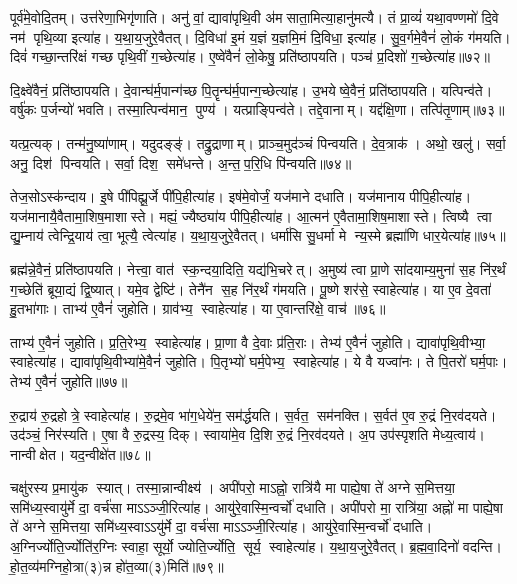 पूर्व॑मे॒वोदि॒तम्। 
उत्त॑रेणा॒भिगृ॑णाति। 
अनु॑ वां॒ द्यावा॑पृथि॒वी अ॑मसाता॒मित्या॒हानु॑मत्यै। 
तं प्रा॒व्यं॑ यथा॒वण्णमो॑ दि॒वे नम॑ पृथि॒व्या इत्या॑ह। 
य॒था॒य॒जुरे॒वैतत्। 
दि॒विधा॑ इ॒मं य॒ज्ञं य॒ज्ञमि॒मं दि॒विधा॒ इत्या॑ह। 
सु॒व॒र्गमे॒वैनं॑ लो॒कं ग॑मयति। 
दिवं॑ गच्छा॒न्तरि॑क्षं गच्छ पृथि॒वीं ग॒च्छेत्या॑ह। 
ए॒ष्वे॑वैनं॑ लो॒केषु॒ प्रति॑ष्ठापयति। 
पञ्च॑ प्र॒दिशो॑ ग॒च्छेत्या॑ह॥७२॥

दि॒क्ष्वे॑वैनं॒ प्रति॑ष्ठापयति। 
दे॒वान्घ॑र्म॒पान्ग॑च्छ पि॒तॄन्घ॑र्म॒पान्ग॒च्छे\-त्या॑ह। 
उ॒भयेष्वे॒वैनं॒ प्रति॑ष्ठापयति। 
यत्पिन्व॑ते। 
वर्\mbox{}षु॑कः प॒र्जन्यो॑ भवति। 
तस्मा॒त्पिन्व॑मान॒ पुण्य॑। 
यत्प्राङ्पिन्व॑ते। 
तद्दे॒वानाम्। 
यद्द॑क्षि॒णा। 
तत्पि॑तृ॒णाम्॥७३॥

यत्प्र॒त्यक्। 
तन्म॑नु॒ष्या॑णाम्। 
यदुदङ्ङ्॑। 
तद्रु॒द्राणाम्। 
प्राञ्च॒मुद॑ञ्चं पिन्वयति। 
दे॒व॒त्राक॑। 
अथो॒ खलु॑। 
सर्वा॒ अनु॒ दिश॑ पिन्वयति। 
सर्वा॒ दिश॒ समे॑धन्ते। 
अ॒न्त॒प॒रि॒धि पि॑न्वयति॥७४॥

तेज॒सोऽस्क॑न्दाय। 
इ॒षे पी॑पिह्यू॒र्जे पी॑पि॒हीत्या॑ह। 
इष॑मे॒वोर्जं॒ यज॑माने दधाति। 
यज॑मानाय पीपि॒हीत्या॑ह। 
यज॑मानायै॒वैतामा॒शिष॒माशास्ते। 
मह्यं॒ ज्यैष्ठ्या॑य पीपि॒हीत्या॑ह। 
आ॒त्मन॑ ए॒वैतामा॒शिष॒माशास्ते। 
त्विष्यै त्वा द्यु॒म्नाय॑ त्वेन्द्रि॒याय॑ त्वा॒ भूत्यै॒ त्वेत्या॑ह। 
य॒था॒य॒जुरे॒वैतत्। 
धर्मा॑सि सु॒धर्मा मे न्य॒स्मे ब्रह्मा॑णि धार॒येत्या॑ह॥७५॥

ब्रह्म॑न्ने॒वैनं॒ प्रति॑ष्ठापयति। 
नेत्त्वा॒ वात॑ स्क॒न्दया॒दिति॒ यद्य॑भि॒चरेत्। 
अ॒मुष्य॑ त्वा प्रा॒णे सा॑दयाम्य॒मुना॑ स॒ह नि॑र॒र्थं ग॒च्छेति॑ ब्रूया॒द्यं द्वि॒ष्यात्। 
यमे॒व द्वेष्टि॑। 
तेनै॑न स॒ह नि॑र॒र्थं ग॑मयति। 
पू॒ष्णे शर॑से॒ स्वाहेत्या॑ह। 
या ए॒व दे॒वता॑ हु॒तभा॑गाः। 
ताभ्य॑ ए॒वैनं॑ जुहोति। 
ग्राव॑भ्य॒ स्वाहेत्या॑ह। 
या ए॒वान्तरि॑क्षे॒ वाच॑॥७६॥

ताभ्य॑ ए॒वैनं॑ जुहोति। 
प्र॒ति॒रेभ्य॒ स्वाहेत्या॑ह। 
प्रा॒णा वै दे॒वाः प्र॑ति॒राः। 
तेभ्य॑ ए॒वैनं॑ जुहोति। 
द्यावा॑पृथि॒वीभ्या॒ स्वाहेत्या॑ह। 
द्यावा॑पृथि॒वीभ्या॑मे॒वैनं॑ जुहोति। 
पि॒तृभ्यो॑ घर्म॒पेभ्य॒ स्वाहेत्या॑ह। 
ये वै यज्वा॑नः। 
ते पि॒तरो॑ घर्म॒पाः। 
तेभ्य॑ ए॒वैनं॑ जुहोति॥७७॥

रु॒द्राय॑ रु॒द्रहोत्रे॒ स्वाहेत्या॑ह। 
रु॒द्रमे॒व भा॑ग॒धेये॑न॒ सम॑र्द्धयति। 
स॒र्वत॒ सम॑नक्ति। 
स॒र्वत॑ ए॒व रु॒द्रं नि॒रव॑दयते। 
उद॑ञ्चं॒ निर॑स्यति। 
ए॒षा वै रु॒द्रस्य॒ दिक्। 
स्वाया॑मे॒व दि॒शि रु॒द्रं नि॒रव॑दयते। 
अ॒प उप॑स्पृशति मेध्य॒त्वाय॑। 
नान्वीक्षेत। 
यद॒न्वीक्षे॑त॥७८॥

चक्षु॑रस्य प्र॒मायु॑क स्यात्। 
तस्मा॒न्नान्वीक्ष्य॑। 
अपी॑परो॒ माऽह्नो॒ रात्रि॑यै मा पाह्ये॒षा ते॑ अग्ने स॒मित्तया॒ समि॑ध्य॒स्वायु॑र्मे दा॒ वर्च॑सा माऽऽञ्जी॒रित्या॑ह। 
आयु॑रे॒वास्मि॒न्वर्चो॑ दधाति। 
अपी॑परो मा॒ रात्रि॑या॒ अह्नो॑ मा पाह्ये॒षा ते॑ अग्ने स॒मित्तया॒ समि॑ध्य॒स्वाऽऽयु॑र्मे दा॒ वर्च॑सा माऽऽञ्जी॒रित्या॑ह। 
आयु॑रे॒वास्मि॒न्वर्चो॑ दधाति। 
अ॒ग्निर्ज्योति॒र्ज्योति॑र॒ग्निः स्वाहा॒ सूर्यो॒ ज्योति॒र्ज्योति॒ सूर्य॒ स्वाहेत्या॑ह। 
य॒था॒य॒जुरे॒वैतत्। 
ब्र॒ह्म॒वा॒दिनो॑ वदन्ति। 
हो॒त॒व्य॑मग्निहो॒त्रा(३)न्न हो॑त॒व्या(३)मिति॑॥७९॥

